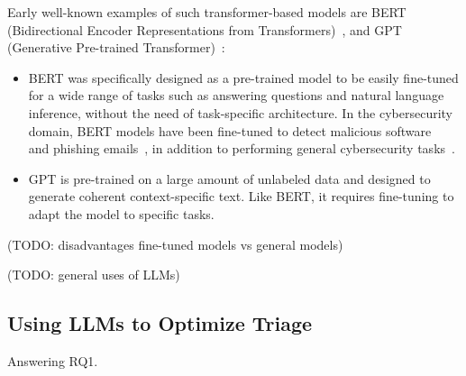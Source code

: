 Early well-known examples of such transformer-based models are BERT
(Bidirectional Encoder Representations from Transformers)\ \citep{devlin2018bert}, and
GPT (Generative Pre-trained Transformer)\ \citep{radford2018improving}:
\begin{itemize}
    \item BERT was specifically designed as a pre-trained model to be easily fine-tuned for a wide range of tasks such
    as answering questions and natural language inference, without the need of task-specific architecture.
    In the cybersecurity domain, BERT models have been fine-tuned to detect malicious
    software\ \citep{rahali2021malbert} and phishing emails\ \citep{lee2020catbert}, in addition to performing general
    cybersecurity tasks\ \citep{bayer2024cysecbert}.
    \item GPT is pre-trained on a large amount of unlabeled data and designed to generate coherent context-specific
    text.
    Like BERT, it requires fine-tuning to adapt the model to specific tasks.
\end{itemize}

(TODO: disadvantages fine-tuned models vs general models) %

(TODO: general uses of LLMs) %

\subsection{Using LLMs to Optimize Triage}
\label{subsec:rq1-llms-in-context}

Answering RQ1.